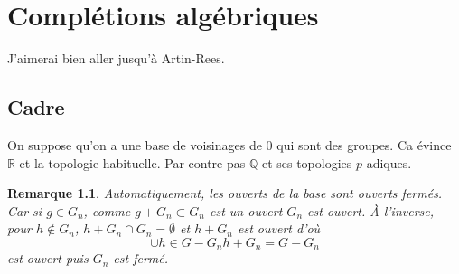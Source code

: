 \documentclass[a4paper,12pt]{book}
\newcommand{\R}{\mathbb{R}}
\newcommand{\Q}{\mathbb{Q}}
\theoremstyle{plain}
\newtheorem{rem}{Remarque}
\theoremstyle{definition}
\theoremstyle{remark}
\begin{document}
\chapter{Complétions algébriques}
J'aimerai bien aller jusqu'à Artin-Rees.
\section{Cadre}
On suppose qu'on a une base de voisinages de $0$ qui sont des
groupes. Ca évince $\R$ et la topologie habituelle. Par contre
pas $\Q$ et ses topologies $p$-adiques.

\begin{rem}
    Automatiquement, les ouverts de la base sont ouverts
    fermés. Car si $g\in G_n$, comme $g+G_n\subset G_n$ est un
    ouvert $G_n$ est ouvert. À l'inverse, pour $h\notin G_n$,
    $h+G_n\cap G_n=\emptyset$ et 
    $h+G_n$
    est ouvert d'où
    \[\cup{h\in G-G_n} h+G_n = G-G_n\]
    est ouvert puis $G_n$ est fermé.
\end{rem}


\section{}




\[\textrm{}\]
\end{document}
